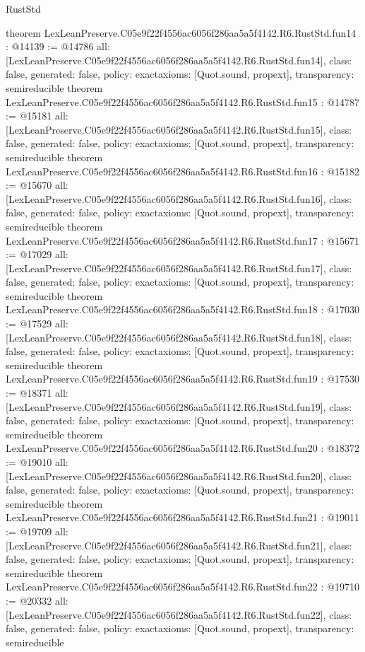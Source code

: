 \begin{lexlean}{RustStd}
\begin{coremodule}
{}
theorem LexLeanPreserve.C05e9f22f4556ac6056f286aa5a5f4142.R6.RustStd.fun14 : @14139 := @14786 {
  all: [LexLeanPreserve.C05e9f22f4556ac6056f286aa5a5f4142.R6.RustStd.fun14],
  class: false,
  generated: false,
  policy: exact{axioms: [Quot.sound, propext]},
  transparency: semireducible
}
theorem LexLeanPreserve.C05e9f22f4556ac6056f286aa5a5f4142.R6.RustStd.fun15 : @14787 := @15181 {
  all: [LexLeanPreserve.C05e9f22f4556ac6056f286aa5a5f4142.R6.RustStd.fun15],
  class: false,
  generated: false,
  policy: exact{axioms: [Quot.sound, propext]},
  transparency: semireducible
}
theorem LexLeanPreserve.C05e9f22f4556ac6056f286aa5a5f4142.R6.RustStd.fun16 : @15182 := @15670 {
  all: [LexLeanPreserve.C05e9f22f4556ac6056f286aa5a5f4142.R6.RustStd.fun16],
  class: false,
  generated: false,
  policy: exact{axioms: [Quot.sound, propext]},
  transparency: semireducible
}
theorem LexLeanPreserve.C05e9f22f4556ac6056f286aa5a5f4142.R6.RustStd.fun17 : @15671 := @17029 {
  all: [LexLeanPreserve.C05e9f22f4556ac6056f286aa5a5f4142.R6.RustStd.fun17],
  class: false,
  generated: false,
  policy: exact{axioms: [Quot.sound, propext]},
  transparency: semireducible
}
theorem LexLeanPreserve.C05e9f22f4556ac6056f286aa5a5f4142.R6.RustStd.fun18 : @17030 := @17529 {
  all: [LexLeanPreserve.C05e9f22f4556ac6056f286aa5a5f4142.R6.RustStd.fun18],
  class: false,
  generated: false,
  policy: exact{axioms: [Quot.sound, propext]},
  transparency: semireducible
}
theorem LexLeanPreserve.C05e9f22f4556ac6056f286aa5a5f4142.R6.RustStd.fun19 : @17530 := @18371 {
  all: [LexLeanPreserve.C05e9f22f4556ac6056f286aa5a5f4142.R6.RustStd.fun19],
  class: false,
  generated: false,
  policy: exact{axioms: [Quot.sound, propext]},
  transparency: semireducible
}
theorem LexLeanPreserve.C05e9f22f4556ac6056f286aa5a5f4142.R6.RustStd.fun20 : @18372 := @19010 {
  all: [LexLeanPreserve.C05e9f22f4556ac6056f286aa5a5f4142.R6.RustStd.fun20],
  class: false,
  generated: false,
  policy: exact{axioms: [Quot.sound, propext]},
  transparency: semireducible
}
theorem LexLeanPreserve.C05e9f22f4556ac6056f286aa5a5f4142.R6.RustStd.fun21 : @19011 := @19709 {
  all: [LexLeanPreserve.C05e9f22f4556ac6056f286aa5a5f4142.R6.RustStd.fun21],
  class: false,
  generated: false,
  policy: exact{axioms: [Quot.sound, propext]},
  transparency: semireducible
}
theorem LexLeanPreserve.C05e9f22f4556ac6056f286aa5a5f4142.R6.RustStd.fun22 : @19710 := @20332 {
  all: [LexLeanPreserve.C05e9f22f4556ac6056f286aa5a5f4142.R6.RustStd.fun22],
  class: false,
  generated: false,
  policy: exact{axioms: [Quot.sound, propext]},
  transparency: semireducible
}
\end{coremodule}
\end{lexlean}
